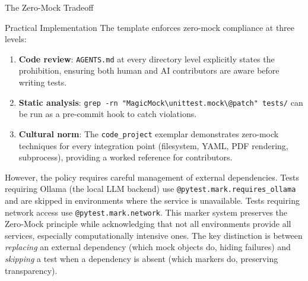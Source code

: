 \documentclass[
  ignorenonframetext,
]{beamer}
\providecommand{\tightlist}{%
  \setlength{\itemsep}{0pt}\setlength{\parskip}{0pt}}
\begin{document}
\begin{frame}[fragile]{The Zero-Mock Tradeoff}
\begin{block}{Practical Implementation}
\protect{}\label{practical-implementation}
The template enforces zero-mock compliance at three levels:

\begin{enumerate}
\tightlist
\item
  \textbf{Code review}: \texttt{AGENTS.md} at every directory level
  explicitly states the prohibition, ensuring both human and AI
  contributors are aware before writing tests.
\item
  \textbf{Static analysis}:
  \texttt{grep\ -rn\ "MagicMock\textbackslash{}\textbar{}unittest.mock\textbackslash{}\textbar{}@patch"\ tests/}
  can be run as a pre-commit hook to catch violations.
\item
  \textbf{Cultural norm}: The \texttt{code\_project} exemplar
  demonstrates zero-mock techniques for every integration point
  (filesystem, YAML, PDF rendering, subprocess), providing a worked
  reference for contributors.
\end{enumerate}

However, the policy requires careful management of external
dependencies. Tests requiring Ollama (the local LLM backend) use
\texttt{@pytest.mark.requires\_ollama} and are skipped in environments
where the service is unavailable. Tests requiring network access use
\texttt{@pytest.mark.network}. This marker system preserves the
Zero-Mock principle while acknowledging that not all environments
provide all services, especially computationally intensive ones. The key
distinction is between \emph{replacing} an external dependency (which
mock objects do, hiding failures) and \emph{skipping} a test when a
dependency is absent (which markers do, preserving transparency).
\end{block}
\end{frame}
\end{document}
